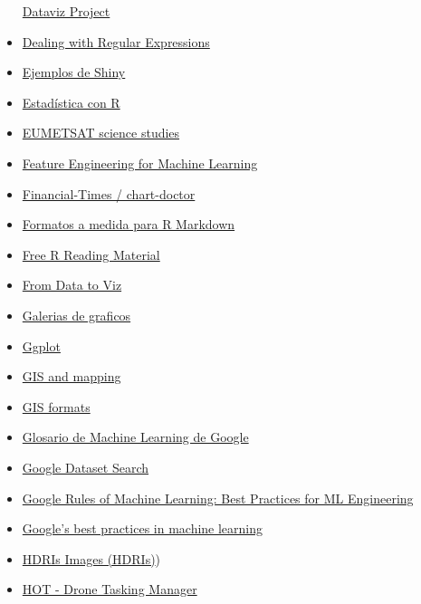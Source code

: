 \documentclass[
]{article}
\begin{document}
\begin{itemize}
  \href{https://datavizproject.com/}{Dataviz Project}
\item
  \href{http://uc-r.github.io/regex}{Dealing with Regular Expressions}
\item
  \href{http://zevross.com/blog/2016/04/19/r-powered-web-applications-with-shiny-a-tutorial-and-cheat-sheet-with-40-example-apps/}{Ejemplos
  de Shiny}
\item
  \href{https://www.cienciadedatos.net/estadistica-con-r.html}{Estadística
  con R}
\item
  \href{https://www.eumetsat.int/science-studies}{EUMETSAT science
  studies}
\item
  \href{https://trainindata.medium.com/feature-engineering-for-machine-learning-a-comprehensive-overview-a7ad04c896f8}{Feature
  Engineering for Machine Learning}
\item
  \href{https://github.com/Financial-Times/chart-doctor/tree/main/visual-vocabulary}{Financial-Times
  / chart-doctor}
\item
  \href{http://www.r-bloggers.com/r-markdown-custom-formats/}{Formatos a
  medida para R Markdown}
\item
  \href{https://committedtotape.shinyapps.io/freeR/}{Free R Reading
  Material}
\item
  \href{https://www.data-to-viz.com/}{From Data to Viz}
\item
  \href{http://www.r-graph-gallery.com/}{Galerias de graficos}
\item
  \href{http://socviz.co/}{Ggplot}
\item
  \href{https://nowosad.github.io/SIGR2021/workshop1/workshop1_jn.html\#1}{GIS
  and mapping}
\item
  \href{https://atlas.co/formats/}{GIS formats}
\item
  \href{https://developers.google.com/machine-learning/glossary/}{Glosario
  de Machine Learning de Google}
\item
  \href{datasetsearch.research.google.com}{Google Dataset Search}
\item
  \href{http://martin.zinkevich.org/rules_of_ml/rules_of_ml.pdf}{Google
  Rules of Machine Learning: Best Practices for ML Engineering}
\item
  \href{https://developers.google.com/machine-learning/guides/rules-of-ml/}{Google's
  best practices in machine learning}
\item
  \href{https://polyhaven.com/hdris}{HDRIs Images (HDRIs)})
\item
  \href{https://github.com/hotosm/Drone-TM}{HOT - Drone Tasking Manager}

\end{itemize}
\end{document}
